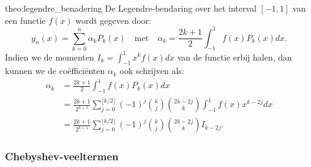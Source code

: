 \begin{theo}{theo:legendre_benadering}
    De Legendre-bendaring over het interval $[-1,1]$ van een functie $f(x)$ wordt gegeven door:
    \begin{equation*}
        y_n(x) = \sum_{k=0}^n \alpha_kP_k(x) \quad \text{met} \quad \alpha_k = \frac{2k+1}{2}\int_{-1}^{1} f(x)P_k(x)dx.
    \end{equation*}
    Indien we de momenten $I_k = \int_{-1}^{1}x^kf(x)dx$ van de functie erbij halen, dan kunnen we de coëfficiënten $\alpha_k$ ook schrijven als:
    \begin{align*}
        \alpha_k 
            &= \frac{2k+1}{2}\int_{-1}^{1} f(x)P_k(x)dx \\
            &= \frac{2k+1}{2^{k+1}} \sum_{j=0}^{\lfloor k/2 \rfloor} (-1)^j \binom{k}{j} \binom{2k-2j}{k} \int_{-1}^{1} f(x)x^{k-2j}dx \\
            &= \frac{2k+1}{2^{k+1}} \sum_{j=0}^{\lfloor k/2 \rfloor} (-1)^j \binom{k}{j} \binom{2k-2j}{k} I_{k-2j}. 
    \end{align*}
\end{theo}

\newpage

\subsubsection{Chebyshev-veeltermen}

\vspace{0.5cm}


